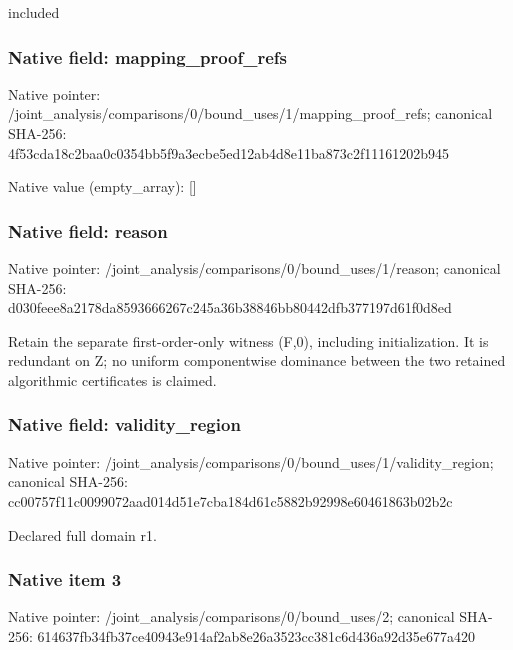 \documentclass[10pt,a4paper]{article}
\begin{document}
\begingroup\raggedright\sloppy included\par\endgroup

\subsubsection{Native field: mapping\_\allowbreak{}proof\_\allowbreak{}refs}
Native pointer: /joint\_\allowbreak{}analysis/comparisons/0/bound\_\allowbreak{}uses/1/mapping\_\allowbreak{}proof\_\allowbreak{}refs; canonical SHA-256: 4f53cda18c2baa0c0354bb5f9a3ecbe5ed12ab4d8e11ba873c2f11161202b945

Native value (empty\_\allowbreak{}array): []

\subsubsection{Native field: reason}
Native pointer: /joint\_\allowbreak{}analysis/comparisons/0/bound\_\allowbreak{}uses/1/reason; canonical SHA-256: d030feee8a2178da8593666267c245a36b38846bb80442dfb377197d61f0d8ed

\begingroup\raggedright\sloppy Retain the separate first-order-only witness (F,\allowbreak{}0),\allowbreak{} including initialization. It is redundant on Z;\allowbreak{} no uniform componentwise dominance between the two retained algorithmic certificates is claimed.\par\endgroup

\subsubsection{Native field: validity\_\allowbreak{}region}
Native pointer: /joint\_\allowbreak{}analysis/comparisons/0/bound\_\allowbreak{}uses/1/validity\_\allowbreak{}region; canonical SHA-256: cc00757f11c0099072aad014d51e7cba184d61c5882b92998e60461863b02b2c

\begingroup\raggedright\sloppy Declared full domain r1.\par\endgroup

\subsubsection{Native item 3}
Native pointer: /joint\_\allowbreak{}analysis/comparisons/0/bound\_\allowbreak{}uses/2; canonical SHA-256: 614637fb34fb37ce40943e914af2ab8e26a3523cc381c6d436a92d35e677a420
\end{document}
